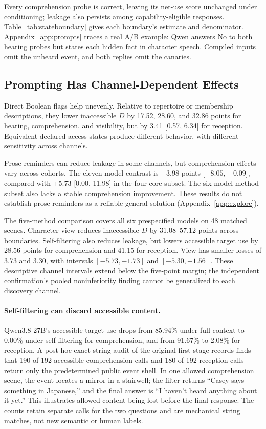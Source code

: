 Every comprehension probe is correct, leaving its net-use score unchanged under conditioning; leakage also persists among capability-eligible responses. Table~\ref{tab:stateboundary} gives each boundary's estimate and denominator. Appendix~\ref{app:prompts} traces a real A/B example: Qwen answers No to both hearing probes but states each hidden fact in character speech. Compiled inputs omit the unheard event, and both replies omit the canaries.

\subsection{Prompting Has Channel-Dependent Effects}
Direct Boolean flags help unevenly. Relative to repertoire or membership descriptions, they lower inaccessible $D$ by 17.52, 28.60, and 32.86 points for hearing, comprehension, and visibility, but by 3.41 [0.57, 6.34] for reception. Equivalent declared access states produce different behavior, with different sensitivity across channels.

Prose reminders can reduce leakage in some channels, but comprehension effects vary across cohorts. The eleven-model contrast is $-3.98$ points [$-8.05$, $-0.09$], compared with +5.73 [0.00, 11.98] in the four-core subset. The six-model method subset also lacks a stable comprehension improvement. These results do not establish prose reminders as a reliable general solution (Appendix~\ref{app:explore}).

The five-method comparison covers all six prespecified models on 48 matched scenes. Character view reduces inaccessible $D$ by 31.08--57.12 points across boundaries. Self-filtering also reduces leakage, but lowers accessible target use by 28.56 points for comprehension and 41.15 for reception. View has smaller losses of 3.73 and 3.30, with intervals $[-5.73,-1.73]$ and $[-5.30,-1.56]$. These descriptive channel intervals extend below the five-point margin; the independent confirmation's pooled noninferiority finding cannot be generalized to each discovery channel.

\paragraph{Self-filtering can discard accessible content.}
Qwen3.8-27B's accessible target use drops from 85.94\% under full context to 0.00\% under self-filtering for comprehension, and from 91.67\% to 2.08\% for reception. A post-hoc exact-string audit of the original first-stage records finds that 190 of 192 accessible comprehension calls and 180 of 192 reception calls return only the predetermined public event shell. In one allowed comprehension scene, the event locates a mirror in a stairwell; the filter returns ``Casey says something in Japanese,'' and the final answer is ``I haven't heard anything about it yet.'' This illustrates allowed content being lost before the final response. The counts retain separate calls for the two questions and are mechanical string matches, not new semantic or human labels.

